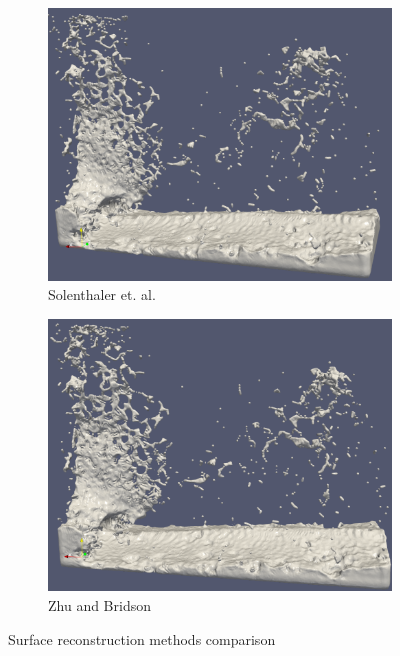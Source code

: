 \begin{figure}
\begin{center}
\begin{subfigure}[b]{0.48\textwidth}
			\includegraphics[width=\textwidth]{figures/SolenthalerEtAlForRelWork.png}
			\caption{Solenthaler et. al.}
		\end{subfigure}
		\begin{subfigure}[b]{0.48\textwidth}
			\includegraphics[width=\textwidth]{figures/ZhuBridsonForRelatedWorks.png}
			\caption{Zhu and Bridson}
		\end{subfigure}

	\end{center}
	\caption{Surface reconstruction methods comparison}
	\label{fig:dam_break_comparison}
\end{figure}
